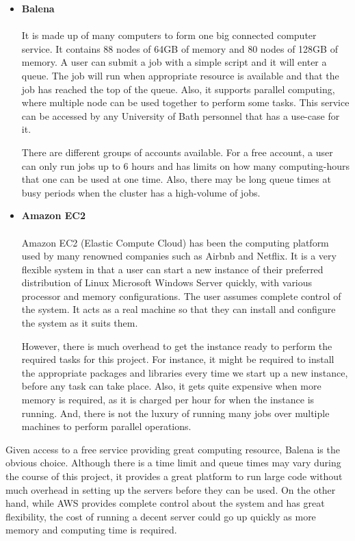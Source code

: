 \begin{itemize}
  \item \textbf{Balena} \\ \\
    It is made up of many computers to form one big connected computer service. It contains 88 nodes of 64GB of memory and 80 nodes of 128GB of memory. A user can submit a job with a simple script and it will enter a queue. The job will run when appropriate resource is available and that the job has reached the top of the queue. Also, it supports parallel computing, where multiple node can be used together to perform some tasks. This service can be accessed by any University of Bath personnel that has a use-case for it. 
    
    There are different groups of accounts available. For a free account, a user can only run jobs up to 6 hours and has limits on how many computing-hours that one can be used at one time. Also, there may be long queue times at busy periods when the cluster has a high-volume of jobs. 
  \\ 
  \item \textbf{Amazon EC2} \\ \\
    Amazon EC2 (Elastic Compute Cloud) has been the computing platform used by many renowned companies such as Airbnb and Netflix. It is a very flexible system in that a user can start a new instance of their preferred distribution of Linux Microsoft Windows Server quickly, with various processor and memory configurations. The user assumes complete control of the system. It acts as a real machine so that they can install and configure the system as it suits them. 
    
    However, there is much overhead to get the instance ready to perform the required tasks for this project. For instance, it might be required to install the appropriate packages and libraries every time we start up a new instance, before any task can take place. Also, it gets quite expensive when more memory is required, as it is charged per hour for when the instance is running. And, there is not the luxury of running many jobs over multiple machines to perform parallel operations.
\end{itemize}

Given access to a free service providing great computing resource, Balena is the obvious choice. Although there is a time limit and queue times may vary during the course of this project, it provides a great platform to run large code without much overhead in setting up the servers before they can be used. On the other hand, while AWS provides complete control about the system and has great flexibility, the cost of running a decent server could go up quickly as more memory and computing time is required.


